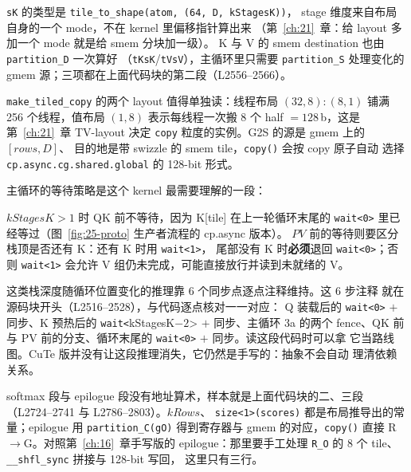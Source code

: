 \texttt{sK} 的类型是 \texttt{tile\_\allowbreak{}to\_\allowbreak{}shape\allowbreak{}(atom,\allowbreak{} (64,\allowbreak{} D,\allowbreak{} k\allowbreak{}Stages\allowbreak{}K))}，
stage 维度来自布局自身的一个 mode，不在 kernel 里偏移指针算出来
（第~\ref{ch:21}~章：给 layout 多加一个 mode 就是给 smem 分块加一级）。
K 与 V 的 smem destination 也由 \texttt{partition\_D} 一次算好
（\texttt{tKsK}/\texttt{tVsV}），主循环里只需要 \texttt{partition\_S}
处理变化的 gmem 源；三项都在上面代码块的第二段（L2556--2566）。

\texttt{make\_\allowbreak{}tiled\_\allowbreak{}copy} 的两个 layout 值得单独读：线程布局
$(32,8){:}(8,1)$ 铺满 256 个线程，值布局 $(1,8)$ 表示每线程一次搬
8 个 half $=128$\,b，这是第~\ref{ch:21}~章 TV-layout 决定
\texttt{copy} 粒度的实例。G2S 的源是 gmem 上的 $[rows, D]$、
目的地是带 swizzle 的 smem tile，\texttt{copy()} 会按 copy 原子自动
选择 \texttt{cp.\allowbreak{}async.\allowbreak{}cg.\allowbreak{}shared.\allowbreak{}global} 的 128-bit 形式。

主循环的等待策略是这个 kernel 最需要理解的一段：



$kStagesK>1$ 时 QK 前不等待，因为 K[tile] 在上一轮循环末尾的
\texttt{wait<0>} 里已经等过（图~\ref{fig:25-proto} 生产者流程的 cp.async 版本）。
$PV$ 前的等待则要区分栈顶是否还有 K：还有 K 时用 \texttt{wait<1>}，
尾部没有 K 时\textbf{必须}退回 \texttt{wait<0>}；否则 \texttt{wait<1>}
会允许 V 组仍未完成，可能直接放行并读到未就绪的 V。

这类栈深度随循环位置变化的推理靠 6 个同步点逐点注释维持。这 6 步注释
就在源码块开头（L2516--2528），与代码逐点核对一一对应：
Q 装载后的 \texttt{wait<0>} $+$ 同步、K 预热后的
\texttt{wait<}kStagesK${-}2$> $+$ 同步、主循环 3a 的两个 fence、QK 前与
PV 前的分支、循环末尾的 \texttt{wait<0>} $+$ 同步。读这段代码时可以拿
它当路线图。CuTe 版并没有让这段推理消失，它仍然是手写的：抽象不会自动
理清依赖关系。

softmax 段与 epilogue 段没有地址算术，样本就是上面代码块的二、三段
（L2724--2741 与 L2786--2803）。$kRows$、
\texttt{size\allowbreak{}<1>\allowbreak{}(scores)} 都是布局推导出的常量；epilogue 用
\texttt{partition\_\allowbreak{}C\allowbreak{}(g\allowbreak{}O)} 得到寄存器与 gmem 的对应，\texttt{copy()} 直接
R$\to$G。对照第~\ref{ch:16}~章手写版的 epilogue：那里要手工处理
\texttt{R\_O} 的 8 个 tile、\texttt{\_\_shfl\_sync} 拼接与 128-bit 写回，
这里只有三行。

